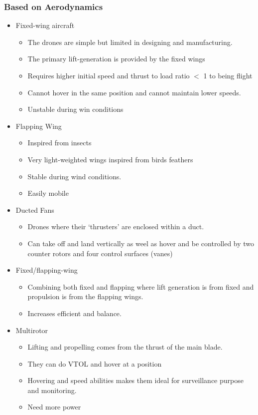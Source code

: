 \documentclass[11pt,twocolumn,letterpaper]{article}
\begin{document}
\subsubsection{Based on Aerodynamics}
\begin{itemize}
\item Fixed-wing aircraft 
\begin{itemize}
    \item The drones are simple but limited in designing and manufacturing.
    \item The primary lift-generation is provided by the fixed wings
    \item Requires higher initial speed and thrust to load ratio $<$ 1 to being flight
    \item Cannot hover in the same position and cannot maintain lower speeds.
    \item Unstable during win conditions
\end{itemize}
\item Flapping Wing
\begin{itemize}
    \item Inspired from insects
    \item Very light-weighted wings inspired from birds feathers
    \item Stable during wind conditions.
    \item Easily mobile 
\end{itemize}
\item Ducted Fans
\begin{itemize}
    \item Drones where their ‘thrusters’ are enclosed within a duct.
    \item Can take oﬀ and land vertically as weel as hover and be controlled by two counter rotors and four control surfaces (vanes)
\end{itemize}

\item Fixed/flapping-wing
\begin{itemize}
    \item Combining both fixed and flapping where lift generation is from fixed and propulsion is from the flapping wings.
    \item Increases efficient and balance.
\end{itemize}
\item Multirotor
\begin{itemize}
    \item Lifting and propelling comes from the thrust of the main blade.
    \item They can do VTOL and hover at a position
    \item Hovering and speed abilities makes them ideal for surveillance purpose and monitoring.
    \item Need more power

\end{itemize}

\end{itemize}
\end{document}
